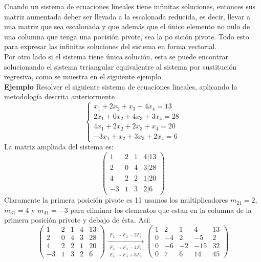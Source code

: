 \documentclass[12pt]{book}
\begin{document}
    Cuando un sistema de ecuaciones lineales tiene infinitas soluciones, entonces sus matriz aumentada deber ser llevada a la escalonada reducida,
    es decir, llevar a una matriz que sea escalonada y que además que el único
    elemento no nulo de una columna que tenga una pocisión pivote, sea la po
    sición pivote. Todo esto para expresar las infinitas soluciones del sistema en forma vectorial. \\ 
    
    Por otro lado si el sistema tiene única solución, esta se puede encontrar
    solucionando el sistema trriangular equivalentre al sistema por sustitución
    regresiva, como se muestra en el siguiente ejemplo. \\ 
    
    \textbf{Ejemplo} Resolver el siguiente sistema de ecuaciones lineales, aplicando la metodología descrita anteriormente
    \begin{equation*}
        \begin{cases}
        x_{1}+2x_{2}+x_{3}+4x_{4}=13 \\
        2x_{1}+0x_{2}+4x_{3}+3x_{4} =28 \\
        4x_{1}+2x_{2}+2x_{3}+x_{4}=20\\ 
        -3x_{1}+x_{2}+3x_{3}+2x_{4} = 6
        \end{cases}
    \end{equation*}
    La matriz ampliada del sistema es:
    \begin{equation*}
        \begin{pmatrix}
            1 & 2 & 1 & 4 |13 \\ 
            2 & 0 & 4 & 3 |28 \\ 
            4 & 2 & 2 & 1 |20 \\ 
            -3 & 1 & 3 & 2 |6 
        \end{pmatrix}
    \end{equation*}
    Claramente la primera posición pivote es 11 usamos los multiplicadores $m_{21}=2$, $m_{31}=4$ y $m_{41}= -3$ para eliminar los elementos que estan en la columna de la primera posición privote y debajo de ésta. Así:
    \begin{equation*}
    \left(
        \begin{array}{rrrr|r}
            1 & 2 & 1 & 4 & 13 \\ 
            2 & 0 & 4 & 3 & 28 \\ 
            4 & 2 & 2 & 1 & 20 \\ 
            -3 & 1 & 3 & 2 & 6 
        \end{array} \right)
        \xrightarrow[\substack{F_3 \to F_3-4F_1 \\ F_4 \to F_4+3F_1}]{F_{2} \to F_{2} -2F_{1}}
    \left(
        \begin{array}{rrrr|r}
             1 & 2 & 1 & 4 & 13 \\ 
            0 & -4 & 2 & -5 & 2 \\ 
            0 & -6 & -2 & -15 & 32 \\ 
            0 & 7 & 6 & 14 & 45 
        \end{array} \right)
    \end{equation*}
\end{document}
